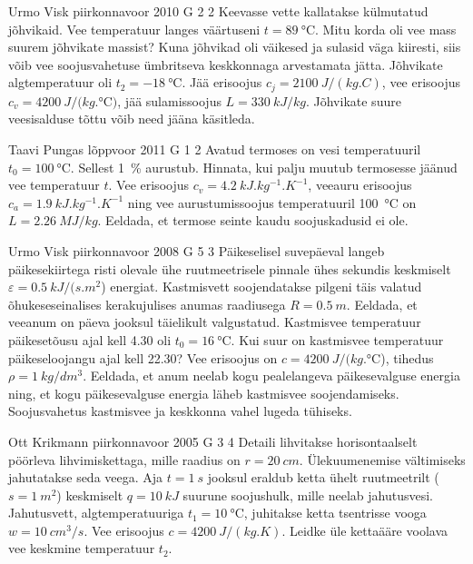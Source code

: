 \documentclass[11pt]{article}
\begin{document}
{%
{Urmo Visk} %
{piirkonnavoor} %
{2010} %
{G 2} %
{2} %
{
\ifStatement
Keevasse vette kallatakse külmutatud jõhvikaid. Vee temperatuur langes väärtuseni $t=\SI{89}{\celsius}$.
Mitu korda oli vee mass suurem jõhvikate massist? Kuna jõhvikad oli väikesed ja sulasid väga kiiresti, siis
võib vee soojusvahetuse ümbritseva keskkonnaga arvestamata jätta. Jõhvikate algtemperatuur oli
$t_2=\SI{-18}{\celsius}$. Jää erisoojus $c_j=\SI{2100}{J/(kg.C)}$, vee erisoojus $c_v=\SI{4200}{J/(kg.\celsius)}$, jää sulamissoojus $L=\SI{330}{kJ/kg}$. Jõhvikate suure veesisalduse tõttu võib need jääna käsitleda.
\fi
}

{Taavi Pungas} %
{lõppvoor} %
{2011} %
{G 1} %
{2} %
{
\ifStatement
Avatud termoses on vesi temperatuuril $t_0 = \SI{100}{\celsius}$. Sellest \SI{1}{\%}
aurustub. Hinnata, kui palju muutub termosesse jäänud vee temperatuur $t$.
Vee erisoojus $c_v = \SI{4,2}{kJ.kg^{-1}.K^{-1}}$, veeauru erisoojus $c_a = \SI{1,9}{kJ.kg^{-1}.K^{-1}}$ ning
vee aurustumissoojus temperatuuril \SI{100}{\celsius} on $L = \SI{2,26}{MJ/kg}$. Eeldada, et termose seinte kaudu soojuskadusid ei ole.
\fi
}

{Urmo Visk} %
{piirkonnavoor} %
{2008} %
{G 5} %
{3} %
{
\ifStatement
Päikeselisel suvepäeval langeb päikesekiirtega risti olevale ühe ruutmeetrisele pinnale ühes sekundis keskmiselt $\varepsilon = \SI{0,5}{kJ/(s.m^2}$) energiat. Kastmisvett soojendatakse pilgeni täis valatud õhukeseseinalises kerakujulises anumas raadiusega $R = \SI{0,5}{m}$. Eeldada, et veeanum on päeva jooksul täielikult valgustatud. Kastmisvee temperatuur päikesetõusu ajal kell 4.30 oli $t_0 = \SI{16}{\celsius}$. Kui suur on kastmisvee temperatuur päikeseloojangu ajal kell 22.30? Vee erisoojus on $c = \SI{4200}{J/(kg.\celsius}$), tihedus $\rho = \SI{1}{kg/dm^3}$. Eeldada, et anum neelab kogu pealelangeva päikesevalguse energia ning, et kogu päikesevalguse energia läheb kastmisvee soojendamiseks. Soojusvahetus kastmisvee ja keskkonna vahel lugeda tühiseks.
\fi
}

{Ott Krikmann} %
{piirkonnavoor} %
{2005} %
{G 3} %
{4} %
{
\ifStatement
Detaili lihvitakse horisontaalselt pöörleva lihvimiskettaga, mille raadius on $r = \SI{20}{cm}$. Ülekuumenemise vältimiseks jahutatakse seda veega. Aja $t = \SI{1}{s}$ jooksul eraldub ketta ühelt ruutmeetrilt ($s = \SI{1}{m^2}$) keskmiselt $q = \SI{10}{kJ}$ suurune soojushulk, mille neelab jahutusvesi. Jahutusvett, algtemperatuuriga $t_1 = \SI{10}{\celsius}$, juhitakse ketta tsentrisse vooga $w = \SI{10}{cm^3/s}$. Vee erisoojus $c = \SI{4200}{J/(kg.K)}$. Leidke üle kettaääre voolava vee keskmine temperatuur $t_2$.
\fi
}

}
\end{document}
